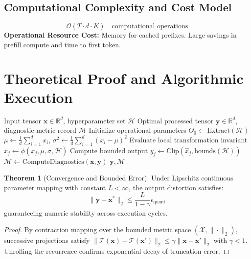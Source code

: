 \documentclass[11pt,a4paper]{article}
\theoremstyle{definition}
\newtheorem{theorem}{\textbf{Theorem}}[section]
\begin{document}
\subsection{Computational Complexity and Cost Model}
\begin{equation}
\mathcal{O}(T \cdot d \cdot K) \quad \text{computational operations}
\end{equation}
\textbf{Operational Resource Cost:} Memory for cached prefixes. Large savings in prefill compute and time to first token.

\section{Theoretical Proof and Algorithmic Execution}

\begin{algorithm}[H]
\caption{Prefix caching (radix-tree KV reuse) Operational Pipeline}
\begin{algorithmic}[1]
\Require Input tensor $\mathbf{x} \in \mathbb{R}^d$, hyperparameter set $\mathcal{H}$
\Ensure Optimal processed tensor $\mathbf{y} \in \mathbb{R}^d$, diagnostic metric record $\mathcal{M}$
\State Initialize operational parameters $\Theta_0 \leftarrow \text{Extract}(\mathcal{H})$
\State $\mu \leftarrow \frac{1}{d} \sum_{i=1}^d x_i$, \quad $\sigma^2 \leftarrow \frac{1}{d} \sum_{i=1}^d (x_i - \mu)^2$
    \State Evaluate local transformation invariant $\hat{x}_j \leftarrow \phi(x_j, \mu, \sigma, \mathcal{H})$
    \State Compute bounded output $y_j \leftarrow \text{Clip}(\hat{x}_j, \text{bounds}(\mathcal{H}))$
\EndFor
\State $\mathcal{M} \leftarrow \text{ComputeDiagnostics}(\mathbf{x}, \mathbf{y})$
\State \Return $\mathbf{y}, \mathcal{M}$
\end{algorithmic}
\end{algorithm}

\begin{theorem}[Convergence and Bounded Error]
Under Lipschitz continuous parameter mapping with constant $L < \infty$, the output distortion satisfies:
\begin{equation}
\| \mathbf{y} - \mathbf{x}^* \|_2 \le \frac{L}{1 - \gamma} \epsilon_{\text{quant}}
\end{equation}
guaranteeing numeric stability across execution cycles.
\end{theorem}

\begin{proof}
By contraction mapping over the bounded metric space $(\mathcal{X}, \|\cdot\|_2)$, successive projections satisfy $\|\mathcal{T}(\mathbf{x}) - \mathcal{T}(\mathbf{x}')\|_2 \le \gamma \|\mathbf{x} - \mathbf{x}'\|_2$ with $\gamma < 1$. Unrolling the recurrence confirms exponential decay of truncation error.
\end{proof}
\end{document}
